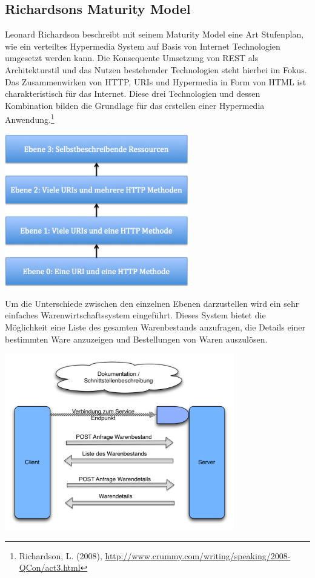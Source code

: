 \subsection{Richardsons Maturity Model}
Leonard Richardson beschreibt mit seinem Maturity Model eine Art Stufenplan, wie ein verteiltes Hypermedia System auf Basis von Internet Technologien umgesetzt werden kann. Die Konsequente Umsetzung von REST als Architekturstil und das Nutzen bestehender Technologien steht hierbei im Fokus. Das Zusammenwirken von HTTP, URIs und Hypermedia in Form von HTML ist charakteristisch für das Internet. Diese drei Technologien und dessen Kombination bilden die Grundlage für das erstellen einer Hypermedia Anwendung.\footnote{Richardson, L. (2008), \url{http://www.crummy.com/writing/speaking/2008-QCon/act3.html}}\\
\begin{center}
		\includegraphics[width=8cm]{graphicx/maturity.png}
		\label{hfaktoren}
	\end{center}
Um die Unterschiede zwischen den einzelnen Ebenen darzustellen wird ein sehr einfaches Warenwirtschaftssystem eingeführt. Dieses System bietet die Möglichkeit eine Liste des gesamten Warenbestands anzufragen, die Details einer bestimmten Ware anzuzeigen und Bestellungen von Waren auszulösen.\\
\begin{center}
		\includegraphics[width=10cm]{graphicx/MaturityLvL0.png}
		\label{hfaktoren}
	\end{center}
